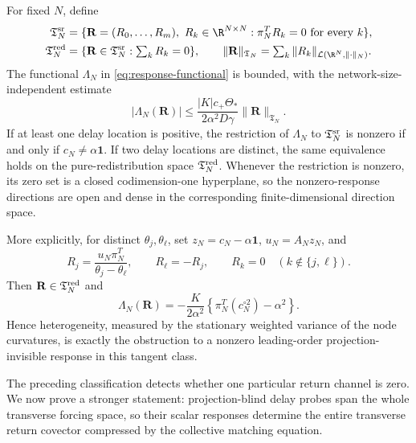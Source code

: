 \begin{theorem}
\label{thm:response-directions}
For fixed \(N\), define
\begin{align*}
 \mathfrak T_N^{\rm sr}
 &=\{\mathbf R=(R_0,\ldots,R_m),\ R_k\in\R^{N\times N}:
       \pi_N^TR_k=0
       \text{ for every }k\},\\
 \mathfrak T_N^{\rm red}
 &=\{\mathbf R\in\mathfrak T_N^{\rm sr}:\textstyle\sum_kR_k=0\},
 \qquad
 \|\mathbf R\|_{\mathfrak T_N}=\sum_k
 \|R_k\|_{\mathcal L(\R^N,\|\cdot\|_N)}.
\end{align*}
The functional \(\Lambda_N\) in \cref{eq:response-functional} is bounded,
with the network-size-independent estimate
\begin{equation}
 |\Lambda_N(\mathbf R)|
 \le \frac{|K|c_+\Theta_*}{2\alpha^2D\gamma}
       \|\mathbf R\|_{\mathfrak T_N}.                 \label{eq:response-functional-bound}
\end{equation}
If at least one delay location is positive, the restriction of \(\Lambda_N\)
to \(\mathfrak T_N^{\rm sr}\) is nonzero if and only if
\(c_N\ne\alpha\mathbf1\).  If two delay locations are distinct, the same
equivalence holds on the pure-redistribution space
\(\mathfrak T_N^{\rm red}\).  Whenever the restriction is nonzero, its
zero set is a closed codimension-one hyperplane, so the nonzero-response
directions are open and dense in the corresponding finite-dimensional
direction space.

More explicitly, for distinct \(\theta_j,\theta_\ell\), set
\(z_N=c_N-\alpha\mathbf1\), \(u_N=A_Nz_N\), and
\begin{equation}
 R_j=\frac{u_N\pi_N^T}{\theta_j-\theta_\ell},\qquad
 R_\ell=-R_j,\qquad R_k=0\quad(k\notin\{j,\ell\}).  \label{eq:variance-witness}
\end{equation}
Then \(\mathbf R\in\mathfrak T_N^{\rm red}\) and
\begin{equation}
 \Lambda_N(\mathbf R)
 =-\frac{K}{2\alpha^2}
   \left\{\pi_N^T(c_N^{\circ2})-\alpha^2\right\}.    \label{eq:variance-response}
\end{equation}
Hence heterogeneity, measured by the stationary weighted variance of the
node curvatures, is exactly the obstruction to a nonzero leading-order
projection-invisible response in this tangent class.
\end{theorem}

The preceding classification detects whether one particular return channel is
zero.  We now prove a stronger statement: projection-blind delay probes span
the whole transverse forcing space, so their scalar responses determine the
entire transverse return covector compressed by the collective matching
equation.

